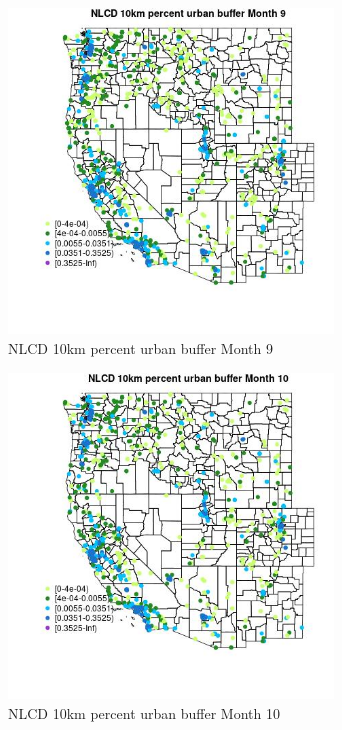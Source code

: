 \begin{figure} 
\centering  
\includegraphics[width=0.77\textwidth]{Code_Outputs/Report_ML_input_PM25_Step4_part_e_de_duplicated_aves_compiled_2019-05-21wNAs_MapObsMo9NLCD_10km_percent_urban_buffer.jpg} 
\caption{\label{fig:Report_ML_input_PM25_Step4_part_e_de_duplicated_aves_compiled_2019-05-21wNAsMapObsMo9NLCD_10km_percent_urban_buffer}NLCD 10km percent urban buffer Month 9} 
\end{figure} 
 

\begin{figure} 
\centering  
\includegraphics[width=0.77\textwidth]{Code_Outputs/Report_ML_input_PM25_Step4_part_e_de_duplicated_aves_compiled_2019-05-21wNAs_MapObsMo10NLCD_10km_percent_urban_buffer.jpg} 
\caption{\label{fig:Report_ML_input_PM25_Step4_part_e_de_duplicated_aves_compiled_2019-05-21wNAsMapObsMo10NLCD_10km_percent_urban_buffer}NLCD 10km percent urban buffer Month 10} 
\end{figure} 
 

